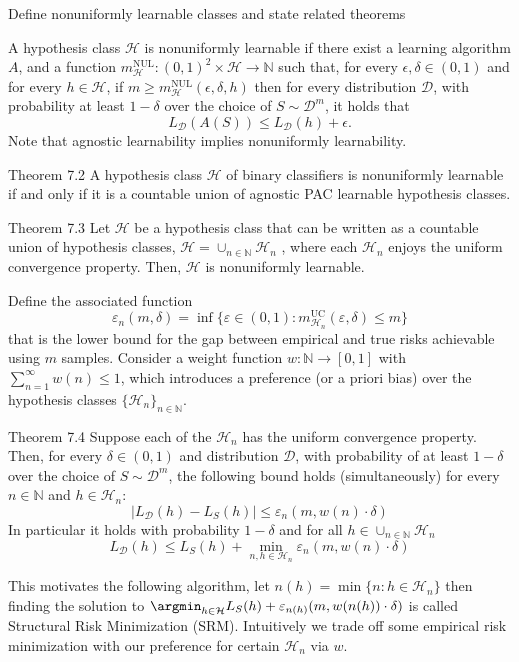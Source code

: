 Define nonuniformly learnable classes and state related theorems 

A hypothesis class \(\mathcal{H}\) is nonuniformly learnable if there exist a learning algorithm \( A \), and a function
\(m_{\mathcal{H}}^{\mathrm{NUL}} : (0,1)^2 \times \mathcal{H} \to \mathbb{N}\)
such that, for every \(\epsilon, \delta \in (0,1)\) and for every \(h \in \mathcal{H}\), 
if \(m \geq m_{\mathcal{H}}^{\mathrm{NUL}}(\epsilon, \delta, h)\) then for every distribution \(\mathcal{D}\), 
with probability at least \(1 - \delta\) over the choice of \(S \sim \mathcal{D}^m\), it holds that
\[
  L_{\mathcal{D}}(A(S)) \leq L_{\mathcal{D}}(h) + \epsilon.
\]
Note that agnostic learnability implies nonuniformly learnability.

Theorem 7.2 
A hypothesis class \( \mathcal{H} \) of binary classifiers is nonuniformly learnable 
if and only if it is a countable union of agnostic PAC learnable hypothesis classes.

Theorem 7.3
Let \( \mathcal{H} \) be a hypothesis class that can be written as a countable  union of hypothesis classes, 
\( \mathcal{H} = \cup_{n \in \mathbb{N}} \mathcal{H}_n\) , where each \( \mathcal{H}_n \) 
enjoys the uniform convergence property. Then, \( \mathcal{H} \) is nonuniformly learnable.

Define the associated function
\[
  \varepsilon_n(m, \delta) = \inf \{ \varepsilon \in (0, 1) : m_{\mathcal{H}_n}^{\text{UC}}(\varepsilon, \delta) \leq m \}  
\]
that is the lower bound for the gap between empirical and true risks achievable using \( m \) samples.
Consider a weight function \( w : \mathbb{N} \to [0, 1] \) with \( \sum_{n=1}^\infty w(n) \leq 1 \),
which introduces a preference (or a priori bias) over the hypothesis classes \( \{ \mathcal{H}_n \}_{n \in \mathbb{N}} \).

Theorem 7.4
Suppose each of the \( \mathcal{H}_n \) has the uniform convergence property.
Then, for every \( \delta \in (0, 1) \) and distribution \( \mathcal{D} \), 
with probability of at least \( 1 - \delta \) over the choice of \( S \sim \mathcal{D}^m \), 
the following bound holds (simultaneously) for every \( n \in \mathbb{N} \) and \( h \in \mathcal{H}_n \):
\[ 
| L_{\mathcal{D}}(h) - L_S(h) | \leq \varepsilon_n(m, w(n) \cdot \delta)
\]
In particular it holds with probability \( 1 - \delta \) and for all \( h \in \cup_{n \in \mathbb{N}} \mathcal{H}_n \)
\[
 L_{\mathcal{D}} (h) \leq L_S(h) + \min_{n,h \in \mathcal{H}_n} \varepsilon_n(m, w(n)\cdot \delta)
\]

This motivates the following algorithm, let \( n(h) = \min \{ n : h \in \mathcal{H}_n \} \)
then finding the solution to  \( \argmin_{h \in \mathcal{H}} L_S(h) + \varepsilon_{n(h)}(m, w(n(h))\cdot \delta) \) 
is called Structural Risk Minimization (SRM). 
Intuitively we trade off some empirical risk minimization with our preference for certain \( \mathcal{H}_n \) via \( w \).

